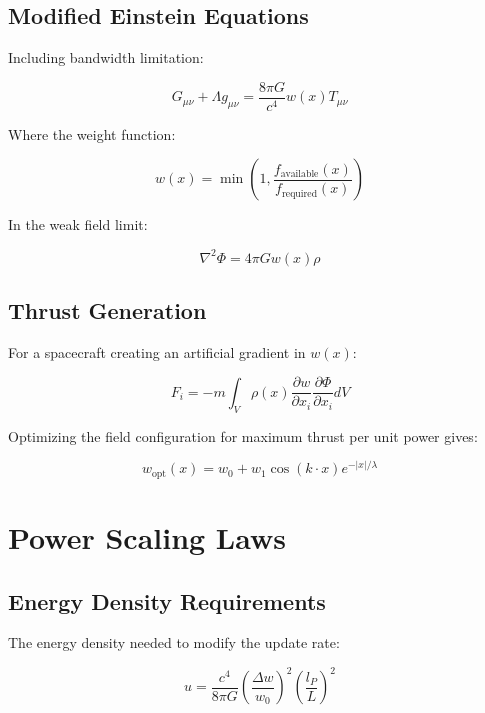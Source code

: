 \documentclass[12pt,letterpaper]{book}
\theoremstyle{definition}
\theoremstyle{plain}
\theoremstyle{remark}
\begin{document}
{{{{{\subsection{Modified Einstein Equations}

Including bandwidth limitation:

\begin{equation}
G_{\mu\nu} + \Lambda g_{\mu\nu} = \frac{8\pi G}{c^4} w(x) T_{\mu\nu}
\end{equation}

Where the weight function:

\begin{equation}
w(x) = \min\left(1, \frac{f_{\text{available}}(x)}{f_{\text{required}}(x)}\right)
\end{equation}

In the weak field limit:

\begin{equation}
\nabla^2 \Phi = 4\pi G w(x) \rho
\end{equation}

\subsection{Thrust Generation}

For a spacecraft creating an artificial gradient in $w(x)$:

\begin{equation}
F_i = -m \int_V \rho(x) \frac{\partial w}{\partial x_i} \frac{\partial \Phi}{\partial x_i} dV
\end{equation}

Optimizing the field configuration for maximum thrust per unit power gives:

\begin{equation}
w_{\text{opt}}(x) = w_0 + w_1 \cos(k \cdot x) e^{-|x|/\lambda}
\end{equation}

\section{Power Scaling Laws}

\subsection{Energy Density Requirements}

The energy density needed to modify the update rate:

\begin{equation}
u = \frac{c^4}{8\pi G} \left(\frac{\Delta w}{w_0}\right)^2 \left(\frac{l_P}{L}\right)^2
\end{equation}

}}}}}
\end{document}
